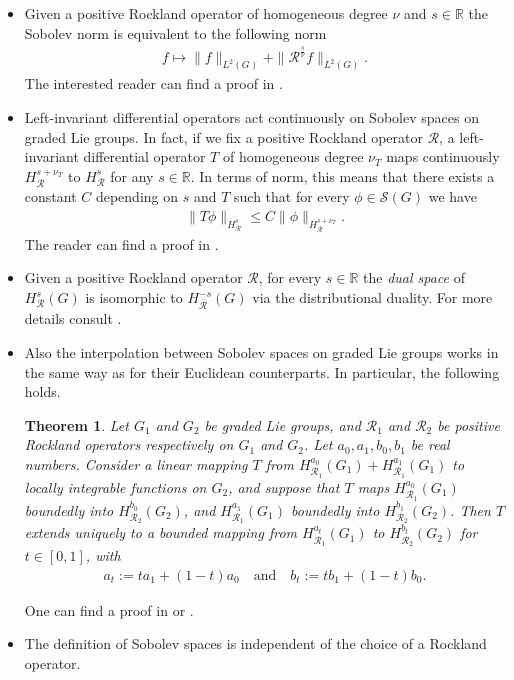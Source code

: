 \documentclass[12pt,oneside,a4paper]{book}
\numberwithin{equation}{section}     %
\theoremstyle{plain}
\newtheorem{theorem}{Theorem}[section]
\theoremstyle{definition}
\newcommand{\R}{{\mathbb R}}
\begin{document}
\begin{itemize}
	
	\item Given a positive Rockland operator of homogeneous degree $\nu$ and $s\in\R$ the Sobolev norm is equivalent to the following norm
	\begin{align}\label{eqSobolevnorm}
	f\mapsto \|f\|_{L^2(G)}+\|\mathcal{R}^{\frac{s}{\nu}}f\|_{L^2(G)}.
	\end{align}
	The interested reader can find a proof in \cite[Theorem 4.4.3]{FR2016}.
	
	\item Left-invariant differential operators act continuously on Sobolev spaces on graded Lie groups. In fact, if we fix a positive Rockland operator $\mathcal{R}$, a left-invariant differential operator $T$ of homogeneous degree $\nu_T$ maps continuously $H^{s+\nu_T}_\mathcal{R}$ to $H^s_\mathcal{R}$ for any $s\in\R$. In terms of norm, this means that there exists a constant $C$ depending on $s$ and $T$ such that for every $\phi\in\mathcal{S}(G)$ we have
	\begin{align}\label{continuosmapping}
	\|T\phi\|_{H^s_{\mathcal{R}}} \leq C \|\phi\|_{H^{s+\nu_T}_{\mathcal{R}}}.
	\end{align}
	The reader can find a proof in \cite[Theorem 4.4.16]{FR2016}.
	
	\item Given a positive Rockland operator $\mathcal R$, for every $s\in\R$ the \textit{dual space} of $H^s_\mathcal{R}(G)$ is isomorphic to $H^{-s}_{\bar{\mathcal{R}}}(G)$ via the distributional duality. For more details consult \cite[Lemma 4.4.7]{FR2016}.
	
	\item Also the interpolation between Sobolev spaces on graded Lie groups works in the same way as for their Euclidean counterparts. In particular, the following holds.
	\begin{theorem}\label{interpolation}
		Let $G_1$ and $G_2$ be graded Lie groups, and $\mathcal{R}_1$ and $\mathcal{R}_2$ be positive Rockland operators respectively on $G_1$ and $G_2$. Let $a_0,a_1,b_0,b_1$ be real numbers. Consider a linear mapping $T$ from $H^{a_0}_{\mathcal{R}_1}(G_1)+H^{a_1}_{\mathcal{R}_1}(G_1)$ to locally integrable functions on $G_2$, and suppose that $T$ maps $H^{a_0}_{\mathcal{R}_1}(G_1)$ boundedly into $H^{b_0}_{\mathcal{R}_2}(G_2)$, and $H^{a_1}_{\mathcal{R}_1}(G_1)$ boundedly into $H^{b_1}_{\mathcal{R}_2}(G_2)$. Then $T$ extends uniquely to a bounded mapping from $H^{a_t}_{\mathcal{R}_1}(G_1)$ to $H^{b_t}_{\mathcal{R}_2}(G_2)$ for $t\in[0,1]$, with
		\begin{align*}
		a_t:=ta_1+(1-t)a_0 \quad\text{and}\quad b_t:=tb_1+(1-t)b_0.
		\end{align*}
	\end{theorem}
	One can find a proof in \cite[Theorem 4.4.9]{FR2016} or \cite[Thereom 4.7]{F75}.
	
	\item The definition of Sobolev spaces is independent of the choice of a Rockland operator. 
\end{itemize}
\end{document}
